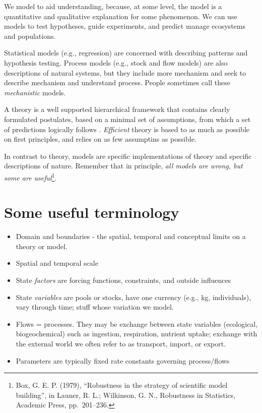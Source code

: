 \documentclass[
]{book}
\providecommand{\tightlist}{%
  \setlength{\itemsep}{0pt}\setlength{\parskip}{0pt}}
\begin{document}
We model to aid understanding, because, at some level, the model is a quantitative and qualitative explanation for some phenomenon. We can use models to test hypotheses, guide experiments, and predict manage ecosystems and populations.

Statistical models (e.g., regression) are concerned with describing patterns and hypothesis testing. Process models (e.g., stock and flow models) are also descriptions of natural systems, but they include more mechanism and seek to describe mechanism and understand process. People sometimes call these \emph{mechanistic} models.

A theory is a well supported hierarchical framework that contains clearly formulated postulates, based on a minimal set of assumptions, from which a set of predictions logically follows \citep{Marquet2014}. \emph{Efficient} theory is based to as much as possible on first principles, and relies on as few assumptins as possible.

In contrast to theory, models are specific implementations of theory and specific descriptions of nature. Remember that in principle, \emph{all models are wrong, but some are useful}\footnote{Box, G. E. P. (1979), ``Robustness in the strategy of scientific model building'', in Launer, R. L.; Wilkinson, G. N., Robustness in Statistics, Academic Press, pp.~201--236.}.

\hypertarget{some-useful-terminology}{%
\section{Some useful terminology}\label{some-useful-terminology}}

\begin{itemize}
\tightlist
\item
  Domain and boundaries - the spatial, temporal and conceptual limits on a theory or model.
\item
  Spatial and temporal scale
\item
  State \emph{factors} are forcing functions, constraints, and outside influences
\item
  State \emph{variables} are pools or stocks, have one currency (e.g., kg, individuals), vary through time; stuff whose variation we model.
\item
  Flows = processes. They may be exchange between state variables (ecological, biogeochemical) such as ingestion, respiration, nutrient uptake; exchange with the external world we often refer to as transport, import, or export.
\item
  Parameters are typically fixed rate constants governing process/flows
\end{itemize}
\end{document}
